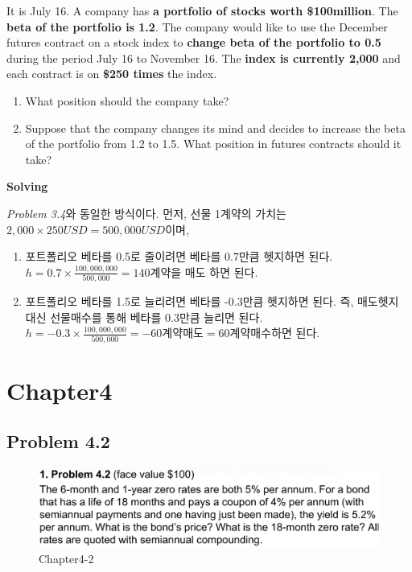 \documentclass[
  letterpaper,
  DIV=11,
  numbers=noendperiod]{scrreprt}
\begin{document}
It is July 16. A company has \textbf{a portfolio of stocks worth
\$100million}. The \textbf{beta of the portfolio is 1.2}. The company
would like to use the December futures contract on a stock index to
\textbf{change beta of the portfolio to 0.5} during the period July 16
to November 16. The \textbf{index is currently 2,000} and each contract
is on \textbf{\$250 times} the index.

\begin{enumerate}
\def\labelenumi{(\arabic{enumi})}
\item
  What position should the company take?
\item
  Suppose that the company changes its mind and decides to increase the
  beta of the portfolio from 1.2 to 1.5. What position in futures
  contracts should it take?
\end{enumerate}

\textbf{Solving}

\emph{Problem 3.4}와 동일한 방식이다. 먼저, 선물 1계약의 가치는
\(2,000\times 250USD=500,000USD\)이며,

\begin{enumerate}
\def\labelenumi{(\arabic{enumi})}
\item
  포트폴리오 베타를 0.5로 줄이려면 베타를 0.7만큼 헷지하면 된다.
  \(h=0.7\times\frac{100,000,000}{500,000}=140계약\)을 매도 하면 된다.
\item
  포트폴리오 베타를 1.5로 늘리려면 베타를 -0.3만큼 헷지하면 된다. 즉,
  매도헷지 대신 선물매수를 통해 베타를 0.3만큼 늘리면 된다.
  \(h=-0.3\times\frac{100,000,000}{500,000}=-60계약 매도=60계약 매수\)하면
  된다.
\end{enumerate}

\section*{Chapter4}\label{chapter4}


\subsection*{\texorpdfstring{\textbf{Problem
4.2}}{Problem 4.2}}\label{problem-4.2}

\begin{figure}[H]

{\centering \includegraphics{images/선물옵션_4-2.png}

}

\caption{Chapter4-2}

\end{figure}%
\end{document}
